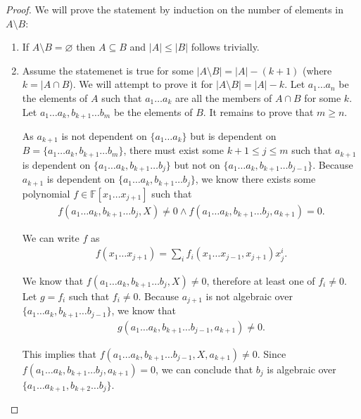 \begin{proof}
	We will prove the statement by induction on the number of elements in $A \setminus B$:
	\begin{enumerate}
		\item If $A \setminus B = \varnothing $ then $A \subseteq B$ and $|A| \leq |B|$ follows trivially.
		\item Assume the statemenet is true for some $|A \setminus B| = |A| - (k + 1)$ (where $k = |A \cap B$). We will attempt to prove it for $|A \setminus B| = |A| - k$. Let $a _1 \ldots a _n$ be the elements of $A$ such that $a _1 \ldots a_k$ are all the members of $A \cap B$ for some $k$. Let $ a _1 \ldots a_k, b _{k + 1} \ldots b _m$ be the elements of $B$. It remains to prove that $m \geq n$.

		      As $a _{k + 1}$ is not dependent on $\{a _1 \ldots a_k\}$ but is dependent on $B = \{a _1 \ldots a _k, b _{k + 1} \ldots b_m\}$, there must exist some $k + 1 \leq j \leq m$ such that $a _{k + 1}$ is dependent on $\{a _1 \ldots a _k, b _{k + 1} \ldots b_j\}$ but  not on $\{a _1 \ldots a _k, b _{k + 1} \ldots b _{j - 1}\}$. Because $a _{k + 1}$ is dependent on $\{a _1 \ldots a _k, b _{k + 1} \ldots b_j\}$, we know there exists some polynomial $f \in \mathbb F[x _1 \ldots x _{j + 1}]$ such that
		      \begin{align*}
			      f(a _1 \ldots a _{k}, b _{k + 1} \ldots b _{j}, X) \neq  0 \land
			      f(a _1 \ldots a _{k}, b _{k + 1} \ldots b _{j}, a _{k + 1})  = 0.
		      \end{align*}

		      We can write $f$ as
		      \begin{align*}
			      f(x _1 \ldots x _{j + 1})
			      = \sum_i f _i(x _1 \ldots x _{j - 1}, x _{j + 1}) x _j ^i.
		      \end{align*}

		      We know that $f(a _1 \ldots a _{k}, b _{k + 1} \ldots b _{j}, X) \neq  0$, therefore at least one of $f _i \neq 0$. Let $g = f _i $ such that $f _i \neq 0$. Because $a _{j + 1}$ is not algebraic over $\{a _1 \ldots a _k, b _{k + 1} \ldots b _{j - 1}\}$, we know that
		      \begin{align*}
			      g(a _1 \ldots a _k, b _{k + 1} \ldots b _{j - 1}, a _{k + 1}) \neq 0.
		      \end{align*}

		      This implies that $f(a _1 \ldots a _k, b _{k + 1} \ldots b _{j - 1}, X, a _{k + 1}) \neq 0$. Since $ f(a _1 \ldots a _{k}, b _{k + 1} \ldots b _{j}, a _{k + 1})  = 0$, we can conclude that $b_j$ is algebraic over $\{a _1 \ldots a _{k + 1}, b _{k + 2} \ldots b _j\}$.


\end{enumerate}
\end{proof}
